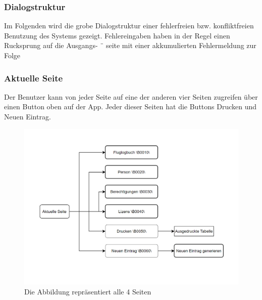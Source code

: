 \documentclass[a4paper]{article} %
\begin{document}
    \subsubsection{Dialogstruktur}
    Im Folgenden wird die grobe Dialogstruktur einer fehlerfreien bzw. konfliktfreien Benutzung
    des Systems gezeigt. Fehlereingaben haben in der Regel einen Rucksprung auf die Ausgangs- ¨
    seite mit einer akkumulierten Fehlermeldung zur Folge\\
    \subsubsection{Aktuelle Seite}
    Der Benutzer kann von jeder Seite auf eine der anderen vier Seiten zugreifen über einen Button oben auf der App. Jeder dieser Seiten hat die Buttons \glqq{}Drucken\grqq{} und \glqq{} Neuen Eintrag\grqq{}.
    \begin{figure}[h!]
        \centering
        \includegraphics{Benutzeroberflaeche_Floglogbuch.png}
        \caption{Die Abbildung repräsentiert alle 4 Seiten}
        \label{fig:my_label}
    \end{figure}
    \pagebreak
\end{document}
